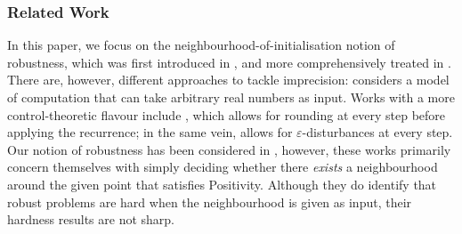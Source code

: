 \subsubsection*{Related Work} 
In this paper, we focus on the neighbourhood-of-initialisation notion of robustness, which was first introduced in \cite{originalstacs}, and more comprehensively treated in \cite{originalarxiv}. There are, however, different approaches to tackle imprecision: \cite{N21} considers a model of computation that can take arbitrary real numbers as input. Works with a more control-theoretic flavour include \cite{rounding20}, which allows for rounding at every step before applying the recurrence; in the same vein, \cite{pseudo21} allows for $\varepsilon$-disturbances at every step. Our notion of robustness has been considered in \cite{originalstacs,originalarxiv,pseudo21}, however, these works primarily concern themselves with simply deciding whether there \textit{exists} a neighbourhood around the given point that satisfies Positivity. Although they do identify that robust problems are hard when the neighbourhood is given as input, their hardness results are not sharp.

